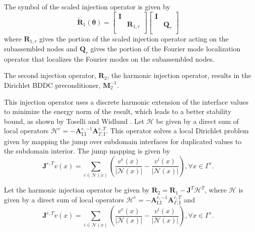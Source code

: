 \documentclass[review]{siamart190516}
\begin{document}
\begin{definition}
The symbol of the scaled injection operator is given by
\begin{equation}
\tilde{\mathbf{R}}_1 \left( \boldsymbol{\theta} \right) =
\begin{bmatrix}
\mathbf{I} &                    \\
           & \mathbf{R}_{1, r}  \\
\end{bmatrix}
\begin{bmatrix}
\mathbf{I} &                 \\
           & \mathbf{Q}_{r}  \\
\end{bmatrix}
\end{equation}
where $\mathbf{R}_{1, r}$ gives the portion of the scaled injection operator acting on the subassembled nodes and $\mathbf{Q}_r$ gives the portion of the Fourier mode localization operator that localizes the Fourier modes on the subassembled nodes.
\label{def:scaled_injection_symbol}
\end{definition}

The second injection operator, $\mathbf{R}_2$, the harmonic injection operator, results in the Dirichlet BDDC preconditioner, $\mathbf{M}^{-1}_2$.

This injection operator uses a discrete harmonic extension of the interface values to minimize the energy norm of the result, which leads to a better stability bound, as shown by Toselli and Widlund \cite{toselli2006domain}.
Let $\boldsymbol{\mathcal{H}}$ be given by a direct sum of local operators $\boldsymbol{\mathcal{H}}^e = - \mathbf{A}_{\text{I}, \text{I}}^{e, -1} \mathbf{A}_{\Gamma, \text{I}}^{e, T}$.
This operator solves a local Dirichlet problem given by mapping the jump over subdomain interfaces for duplicated values to the subdomain interior.
The jump mapping is given by
\begin{equation}
\mathbf{J}^{e, T} v \left( x \right) = \sum_{i \in \mathcal{N} \left( x \right)} \left( \frac{v^e \left( x \right)}{\lvert \mathcal{N} \left( x \right) \rvert} - \frac{v^i \left( x \right)}{\lvert \mathcal{N} \left( x \right) \rvert} \right), \forall x \in \Gamma^e.
\end{equation}

\begin{definition}
Let the harmonic injection operator be given by $\mathbf{R}_2 = \mathbf{R}_1 - \mathbf{J}^T \boldsymbol{\mathcal{H}}^T$, where $\boldsymbol{\mathcal{H}}$ is given by a direct sum of local operators $\boldsymbol{\mathcal{H}}^e = - \mathbf{A}_{\text{I}, \text{I}}^{e, -1} \mathbf{A}_{\Gamma, \text{I}}^{e, T}$ and
\begin{equation}
\mathbf{J}^{e, T} v \left( x \right) = \sum_{i \in \mathcal{N} \left( x \right)} \left( \frac{v^e \left( x \right)}{\lvert \mathcal{N} \left( x \right) \rvert} - \frac{v^i \left( x \right)}{\lvert \mathcal{N} \left( x \right) \rvert} \right), \forall x \in \Gamma^e.
\end{equation}
\label{def:harmonicinjection}
\end{definition}
\end{document}
